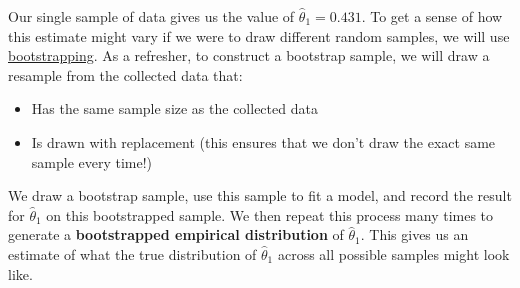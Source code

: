 \documentclass[
  letterpaper,
  DIV=11,
  numbers=noendperiod]{scrreprt}
\providecommand{\tightlist}{%
  \setlength{\itemsep}{0pt}\setlength{\parskip}{0pt}}\usepackage{longtable,booktabs,array}
\begin{document}
Our single sample of data gives us the value of
\(\hat{\theta}_1=0.431\). To get a sense of how this estimate might vary
if we were to draw different random samples, we will use
\href{https://inferentialthinking.com/chapters/13/2/Bootstrap.html?}{bootstrapping}.
As a refresher, to construct a bootstrap sample, we will draw a resample
from the collected data that:

\begin{itemize}
\tightlist
\item
  Has the same sample size as the collected data
\item
  Is drawn with replacement (this ensures that we don't draw the exact
  same sample every time!)
\end{itemize}

We draw a bootstrap sample, use this sample to fit a model, and record
the result for \(\hat{\theta}_1\) on this bootstrapped sample. We then
repeat this process many times to generate a \textbf{bootstrapped
empirical distribution} of \(\hat{\theta}_1\). This gives us an estimate
of what the true distribution of \(\hat{\theta}_1\) across all possible
samples might look like.
\end{document}
